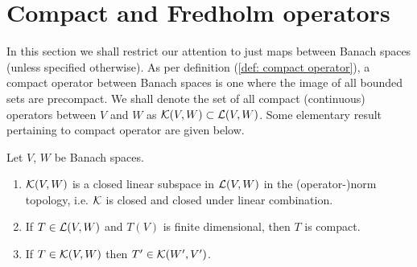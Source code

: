 \documentclass[12pt]{article}
\begin{document}
\section{Compact and Fredholm operators}
    
In this section we shall restrict our attention to just maps between Banach spaces (unless specified otherwise). As per definition (\ref{def: compact operator}), a compact operator between Banach spaces is one where the image of all bounded sets are precompact. We shall denote the set of all compact (continuous) operators between $V$ and $W$ as ${\cal{K}}(V, W) \subset {\cal{L}}(V, W)$. Some elementary result pertaining to compact operator are given below. 


\begin{flemma} Let $V$, $W$ be Banach spaces. 
    \begin{enumerate}
        \item ${\cal{K}}(V, W)$ is a closed linear subspace in ${\cal{L}}(V, W)$ in the (operator-)norm topology, i.e. ${\cal{K}}$ is closed and closed under linear combination. 
        \item If $T \in {\cal{L}}(V, W)$ and $T(V)$ is finite dimensional, then $T$ is compact. 
        \item If $T \in {\cal{K}}(V, W)$ then $T' \in {\cal{K}}(W', V')$. 
    \end{enumerate}
\end{flemma}
\end{document}
